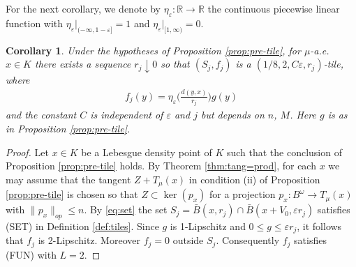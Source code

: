 \documentclass{amsart}
\newtheorem{corollary}[theorem]{Corollary}
\numberwithin{equation}{section}
\newcommand{\R}{\mathbb{R}}
\begin{document}
For the next corollary, we denote by $\eta_\varepsilon:\R\to \R$ the continuous piecewise linear function with $\eta_\varepsilon|_{(-\infty,1-\varepsilon]}=1$ and $\eta_\varepsilon|_{[1,\infty)}=0$.
\begin{corollary}\label{cor:pre-tile}
Under the hypotheses of Proposition \ref{prop:pre-tile}, for $\mu$-a.e. $x\in K$ there exists a sequence $r_j\downarrow 0$ so that $(S_j,f_j)$ is a $(1/8,2,C\varepsilon,r_j)$-tile, where
\begin{align*}
f_j(y)=\eta_\varepsilon\Big(\frac{d(y,x)}{ r_j}\Big)g(y)
\end{align*}
and the constant $C$ is independent of $\varepsilon$ and $j$ but depends on $n$, $M$. Here $g$ is as in Proposition \ref{prop:pre-tile}.
\end{corollary}
\begin{proof}
Let $x\in K$ be a Lebesgue density point of $K$ such that the conclusion of Proposition \ref{prop:pre-tile} holds.  By Theorem \ref{thm:tang=prod}, for each $x$ we may assume that the tangent $Z+T_\mu(x)$ in condition (ii) of Proposition \ref{prop:pre-tile} is chosen so that $Z\subset \ker(p_x)$ for a projection $p_x:B^\omega\to T_\mu(x)$ with $\|p_x\|_{op}\le n$. By \eqref{eq:set} the set $S_j=\bar B(x,r_j)\cap \bar B(x+V_0,\varepsilon r_j)$ satisfies (SET) in Definition \ref{def:tiles}. Since $g$ is 1-Lipschitz and $0\le g\le \varepsilon r_j$, it follows that $f_j$ is 2-Lipschitz. Moreover $f_j=0$ outside $S_j$. Consequently $f_j$ satisfies (FUN) with $L=2$.


\end{proof}
\end{document}

